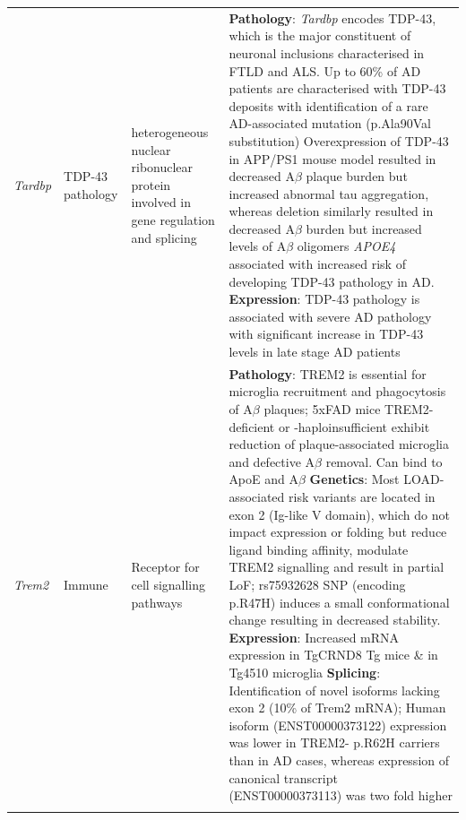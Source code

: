 \begin{changemargin}{1.5cm}
\begin{landscape}
\begin{longtable}[c]{p{1cm}p{2cm}p{4cm}p{19cm}}
			\centering \textit{Tardbp} &
			\centering TDP-43 pathology  &
			\centering heterogeneous nuclear ribonuclear protein involved in gene regulation and splicing &			
			\tabitem  \textbf{Pathology}: \textit{Tardbp} encodes TDP-43, which is the major constituent of neuronal inclusions characterised in FTLD and ALS\cite{Brouwers2010}. \newline 
			\tabitem Up to 60\% of AD patients are characterised with TDP-43 deposits with identification of a rare AD-associated mutation (p.Ala90Val substitution)\cite{Brouwers2010} \newline   
			\tabitem Overexpression of TDP-43 in APP/PS1 mouse model resulted in decreased A$\beta$ plaque burden but increased abnormal tau aggregation\cite{Davis2017}, whereas deletion similarly resulted in decreased A$\beta$ burden but increased levels of A$\beta$ oligomers\cite{LaClair2016} \newline 
			\tabitem \textit{APOE4} associated with increased risk of developing TDP-43 pathology in AD.  \newline
			\tabitem \textbf{Expression}: TDP-43 pathology is associated with severe AD pathology with significant increase in TDP-43 levels in late stage AD patients\cite{Herman2011} \\
			\hdashline[0.5pt/5pt]	
			
			
			\centering \textit{Trem2} &
			\centering Immune  &
			\centering Receptor for cell signalling pathways\newline &
			\tabitem \textbf{Pathology}: TREM2 is essential for microglia recruitment and phagocytosis of A$\beta$ plaques; 5xFAD mice TREM2-deficient or -haploinsufficient exhibit reduction of plaque-associated microglia and defective A$\beta$ removal\cite{Wang2015a}. Can bind to ApoE and A$\beta$ \newline
			\tabitem \textbf{Genetics}: Most LOAD-associated risk variants are located in exon 2 (Ig-like V domain), which do not impact expression or folding but reduce ligand binding affinity\cite{Kober2016}, modulate TREM2 signalling and result in partial LoF\cite{Guerreiro2013a};  rs75932628 SNP (encoding p.R47H) induces a small conformational change resulting in decreased stability\cite{Kober2016}. \newline
			\tabitem \textbf{Expression}: Increased mRNA expression in TgCRND8 Tg mice\cite{Guerreiro2013a} \& in Tg4510 microglia \cite{Sobue2021} \newline
			\tabitem \textbf{Splicing}: Identification of novel isoforms lacking exon 2 (10\% of Trem2 mRNA)\cite{Kiianitsa2021}; Human isoform (ENST00000373122) expression was lower in TREM2- p.R62H carriers than in AD cases, whereas expression of canonical transcript (ENST00000373113) was two fold higher\cite{Del-Aguila2019} \\
			\hdashline[0.5pt/5pt]
						

\end{longtable}
\end{landscape}
\end{changemargin}
